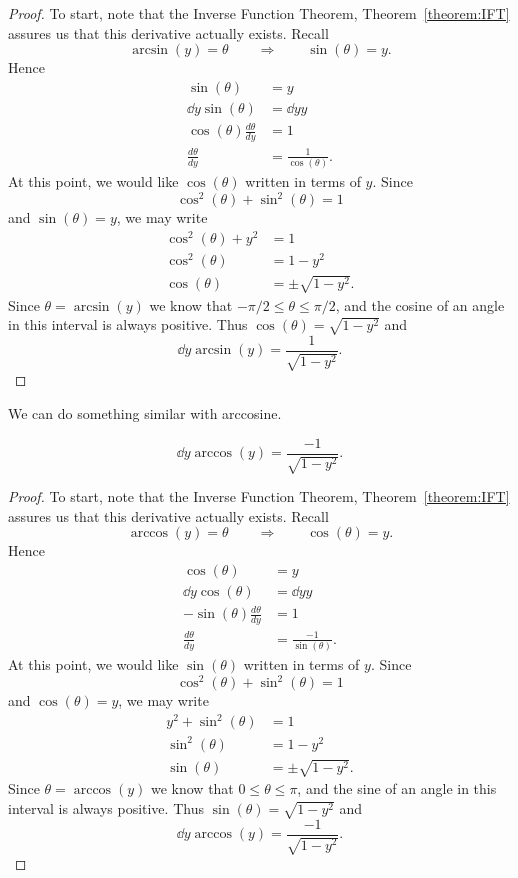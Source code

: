\begin{proof} 
To start, note that the Inverse Function Theorem,
Theorem~\ref{theorem:IFT} assures us that this derivative actually
exists.  Recall
\[
\arcsin(y) = \theta \qquad\Rightarrow\qquad \sin(\theta) = y.
\]
Hence
\begin{align*}
\sin(\theta) &= y\\
\dd{y} \sin(\theta) &= \dd{y} y \\
\cos(\theta) \frac{d\theta}{dy} &= 1 \\
\frac{d\theta}{dy} &= \frac{1}{\cos(\theta)}.
\end{align*}
At this point, we would like $\cos(\theta)$ written in terms of $y$. Since
\[
\cos^2(\theta)+\sin^2(\theta) =1
\]
and $\sin(\theta) = y$, we may write
\begin{align*}
\cos^2(\theta)+y^2 &=1\\
\cos^2(\theta) &=1-y^2\\
\cos(\theta) &= \pm \sqrt{1-y^2}.
\end{align*}
Since $\theta=\arcsin(y)$ we know that $-\pi/2\le \theta\le \pi/2$, and the cosine of
an angle in this interval is always positive. Thus
$\cos(\theta)=\sqrt{1-y^2}$ and 
\[
\dd{y} \arcsin(y) = \frac{1}{\sqrt{1-y^2}}.
\]
\end{proof}

We can do something similar with arccosine. 

\begin{theorem}
\[
\dd{y} \arccos(y) = \frac{-1}{\sqrt{1-y^2}}.
\]
\end{theorem}

\begin{proof} 
To start, note that the Inverse Function Theorem,
Theorem~\ref{theorem:IFT} assures us that this derivative actually
exists.  Recall
\[
\arccos(y) = \theta \qquad\Rightarrow\qquad \cos(\theta) = y.
\]
Hence
\begin{align*}
\cos(\theta) &= y\\
\dd{y} \cos(\theta) &= \dd{y} y \\
-\sin(\theta) \frac{d\theta}{dy} &= 1 \\
\frac{d\theta}{dy} &= \frac{-1}{\sin(\theta)}.
\end{align*}
At this point, we would like $\sin(\theta)$ written in terms of $y$. Since
\[
\cos^2(\theta)+\sin^2(\theta) =1
\]
and $\cos(\theta) = y$, we may write
\begin{align*}
y^2+\sin^2(\theta) &=1\\
\sin^2(\theta) &=1-y^2\\
\sin(\theta) &= \pm \sqrt{1-y^2}.
\end{align*}
Since $\theta=\arccos(y)$ we know that $0\le \theta\le \pi$, and the sine of
an angle in this interval is always positive. Thus
$\sin(\theta)=\sqrt{1-y^2}$ and 
\[
\dd{y} \arccos(y) = \frac{-1}{\sqrt{1-y^2}}.
\]
\end{proof}

